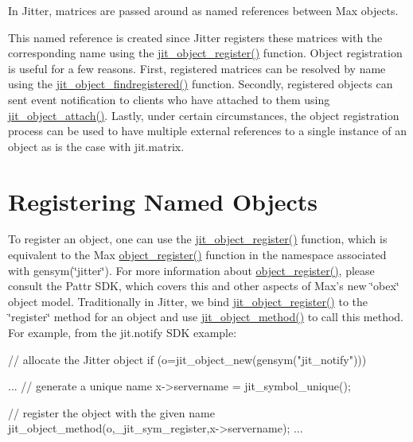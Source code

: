 In Jitter, matrices are passed around as named references between Max objects.

This named reference is created since Jitter registers these matrices with the corresponding name using the \hyperlink{group__objectmod_gabcf088a00f36b6af8ce5896b81e4d0ef}{jit\_\-object\_\-register()} function. Object registration is useful for a few reasons. First, registered matrices can be resolved by name using the \hyperlink{group__objectmod_ga328c0beb469f32437b756852fe8583bf}{jit\_\-object\_\-findregistered()} function. Secondly, registered objects can sent event notification to clients who have attached to them using \hyperlink{group__objectmod_ga213166e8beeb29aca36c57cd07c722f1}{jit\_\-object\_\-attach()}. Lastly, under certain circumstances, the object registration process can be used to have multiple external references to a single instance of an object as is the case with jit.matrix.\hypertarget{chapter_jit_notification_chapter_jit_notification_reg}{}\section{Registering Named Objects}\label{chapter_jit_notification_chapter_jit_notification_reg}
To register an object, one can use the \hyperlink{group__objectmod_gabcf088a00f36b6af8ce5896b81e4d0ef}{jit\_\-object\_\-register()} function, which is equivalent to the Max \hyperlink{group__obj_gaaa97beba179d6aebd3f3ede1b5c781fa}{object\_\-register()} function in the namespace associated with gensym(\char`\"{}jitter\char`\"{}). For more information about \hyperlink{group__obj_gaaa97beba179d6aebd3f3ede1b5c781fa}{object\_\-register()}, please consult the Pattr SDK, which covers this and other aspects of Max's new \char`\"{}obex\char`\"{} object model. Traditionally in Jitter, we bind \hyperlink{group__objectmod_gabcf088a00f36b6af8ce5896b81e4d0ef}{jit\_\-object\_\-register()} to the \char`\"{}register\char`\"{} method for an object and use \hyperlink{group__objectmod_ga9e1b9b8ed4fce611de26a74c6e1452c8}{jit\_\-object\_\-method()} to call this method. For example, from the jit.notify SDK example:


\begin{DoxyCode}
// allocate the Jitter object
if (o=jit_object_new(gensym("jit_notify"))) {
   ...
   // generate a unique name
   x->servername = jit_symbol_unique(); 

   // register the object with the given name
   jit_object_method(o,_jit_sym_register,x->servername); 
   ...
}      
\end{DoxyCode}


